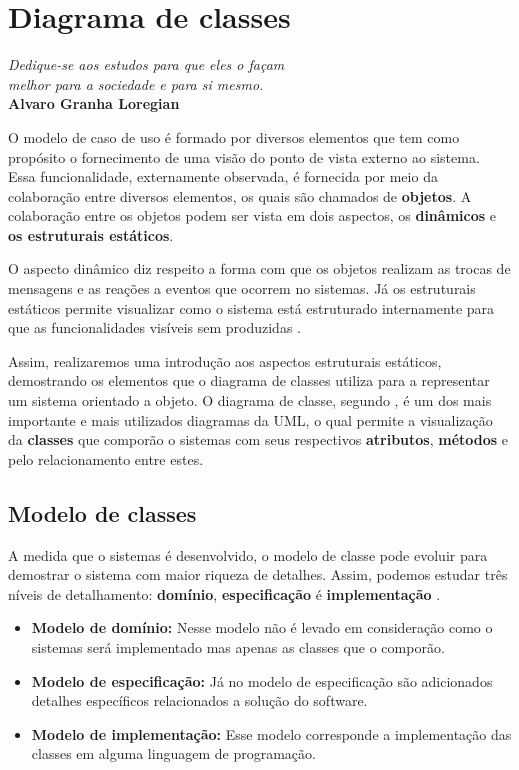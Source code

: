 \chapter{Diagrama de classes}

\begin{flushright}
	\textit{
		Dedique-se aos estudos para que eles o façam \\
		melhor para a sociedade e para si mesmo.
	} \\
	
	\textbf{Alvaro Granha Loregian}
\end{flushright}

O modelo de caso de uso é formado por diversos elementos que tem como propósito o fornecimento de uma visão do ponto de vista externo ao sistema. Essa funcionalidade, externamente observada, é fornecida por meio da colaboração entre diversos elementos, os quais são chamados de \textbf{objetos}. A colaboração entre os objetos podem ser vista em dois aspectos, os \textbf{dinâmicos} e \textbf{os estruturais estáticos}.

O aspecto dinâmico diz respeito a forma com que os objetos realizam as trocas de mensagens e as reações a eventos que ocorrem no sistemas. Já os estruturais estáticos permite visualizar como o sistema está estruturado internamente para que as funcionalidades visíveis sem produzidas \cite{bezerra2016principios}.

Assim, realizaremos uma introdução aos aspectos estruturais estáticos, demostrando os elementos que o diagrama de classes utiliza para a representar um sistema orientado a objeto. O diagrama de classe, segundo , é um dos mais importante e mais utilizados diagramas da UML, o qual permite a visualização da \textbf{classes} que comporão o sistemas com seus respectivos \textbf{atributos}, \textbf{métodos} e pelo relacionamento entre estes.

\section{Modelo de classes}

A medida que o sistemas é desenvolvido, o modelo de classe pode evoluir para demostrar o sistema com maior riqueza de detalhes. Assim, podemos estudar três níveis de detalhamento: \textbf{domínio}, \textbf{especificação} é \textbf{implementação} \cite{bezerra2016principios}.

\begin{itemize}
	\item \textbf{Modelo de domínio: } Nesse modelo não é levado em consideração como o sistemas será implementado mas apenas as classes que o comporão.
	\item \textbf{Modelo de especificação: } Já no modelo de especificação são adicionados detalhes específicos relacionados a solução do software.
	\item \textbf{Modelo de implementação: } Esse modelo corresponde a implementação das classes em alguma linguagem de programação. 
\end{itemize}

